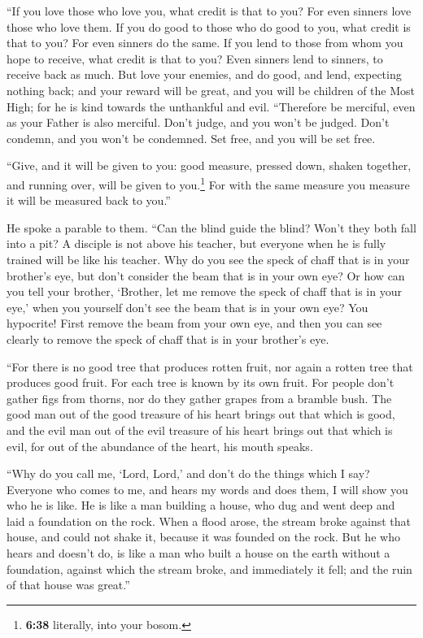  ``If you love those who love you, what credit is that to
you? For even sinners love those who love them.  If you
do good to those who do good to you, what credit is that to you? For
even sinners do the same.  If you lend to those from whom
you hope to receive, what credit is that to you? Even sinners lend to
sinners, to receive back as much.  But love your enemies,
and do good, and lend, expecting nothing back; and your reward will be
great, and you will be children of the Most High; for he is kind towards
the unthankful and evil.  ``Therefore be merciful, even
as your Father is also merciful.  Don't judge, and you
won't be judged. Don't condemn, and you won't be condemned. Set free,
and you will be set free.

 ``Give, and it will be given to you: good measure,
pressed down, shaken together, and running over, will be given to
you.\footnote{\textbf{6:38} literally, into your bosom.} For with the
same measure you measure it will be measured back to you.''

 He spoke a parable to them. ``Can the blind guide the
blind? Won't they both fall into a pit?  A disciple is
not above his teacher, but everyone when he is fully trained will be
like his teacher.  Why do you see the speck of chaff that
is in your brother's eye, but don't consider the beam that is in your
own eye?  Or how can you tell your brother, `Brother, let
me remove the speck of chaff that is in your eye,' when you yourself
don't see the beam that is in your own eye? You hypocrite! First remove
the beam from your own eye, and then you can see clearly to remove the
speck of chaff that is in your brother's eye.

 ``For there is no good tree that produces rotten fruit,
nor again a rotten tree that produces good fruit.  For
each tree is known by its own fruit. For people don't gather figs from
thorns, nor do they gather grapes from a bramble bush. 
The good man out of the good treasure of his heart brings out that which
is good, and the evil man out of the evil treasure of his heart brings
out that which is evil, for out of the abundance of the heart, his mouth
speaks.

 ``Why do you call me, `Lord, Lord,' and don't do the
things which I say?  Everyone who comes to me, and hears
my words and does them, I will show you who he is like. 
He is like a man building a house, who dug and went deep and laid a
foundation on the rock. When a flood arose, the stream broke against
that house, and could not shake it, because it was founded on the rock.
 But he who hears and doesn't do, is like a man who built
a house on the earth without a foundation, against which the stream
broke, and immediately it fell; and the ruin of that house was great.''


